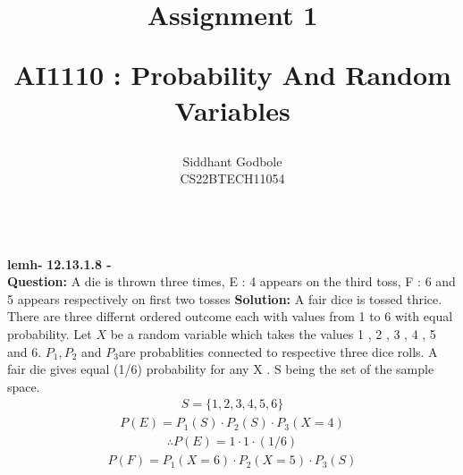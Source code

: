 \documentclass[journal,12pt,onecolumn]{IEEEtran}
\newcommand\tab[1][1cm]{\hspace*{#1}}
\theoremstyle{remark}
\begin{document}
%
\vspace{3cm}
%
\title{
Assignment 1

\large{
AI1110 : Probability And Random Variables}
\author{Siddhant Godbole\\CS22BTECH11054}} 
%       
%
%
%
%
%
%
%        
\maketitle\bigskip
%
%
%
\begin{multicols}{2}
\text{ }
\\
\textbf{lemh-}
\textbf{12.13.1.8 -}
\\
\smallskip
\textbf{Question:}
A die is thrown three times,%
\medskip
\newline
%
E : 4 appears on the third toss,%
\newline
F : 6 and 5 appears respectively \newline
\tab on first two tosses%
\bigskip
%
\text{ }
\newline
\textbf{Solution:}
A fair dice is tossed thrice.\medskip
\newline
There are three differnt ordered outcome each with values from 1 to 6 with equal probability.
\medskip
\newline
Let $X$ be a random variable which takes the values 1 , 2 , 3 , 4 , 5 and 6.
\medskip
\newline
$P_1 , P_2$ and $P_3$are probablities \newline connected to respective three dice rolls.
\medskip
\newline
A fair die gives equal (1/6) probability for any X .
\bigskip
\newline
S being the set of the sample space.
\begin{align}
	 S = \{ 1, 2, 3, 4, 5, 6 \}
\end{align}\columnbreak
\begin{align}
	P(E) =   P_{1}  ( S) \cdot P_2 ( S) \cdot P_3( X = 4 ) 
\end{align}
\begin{align}
\therefore 	P(E) = 1\cdot 1\cdot  (1/6)     	
\end{align}
\begin{align}
	P(F) = P_1(X = 6)\cdot P_2( X = 5) \cdot P_3(S)
\end{align}
\begin{align}

\end{align}
\end{multicols}
\end{document}
